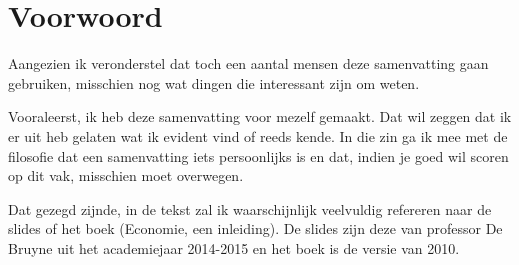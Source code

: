\section*{Voorwoord}
Aangezien ik veronderstel dat toch een aantal mensen deze samenvatting gaan gebruiken, misschien nog wat dingen die interessant zijn om weten.

Vooraleerst, ik heb deze samenvatting voor mezelf gemaakt. Dat wil zeggen dat ik er uit heb gelaten wat ik evident vind of reeds kende. In die zin ga ik mee met de filosofie dat een samenvatting iets persoonlijks is en dat, indien je goed wil scoren op dit vak, misschien moet overwegen.

Dat gezegd zijnde, in de tekst zal ik waarschijnlijk veelvuldig refereren naar de slides of het boek (Economie, een inleiding). De slides zijn deze van professor De Bruyne uit het academiejaar 2014-2015 en het boek is de versie van 2010.
